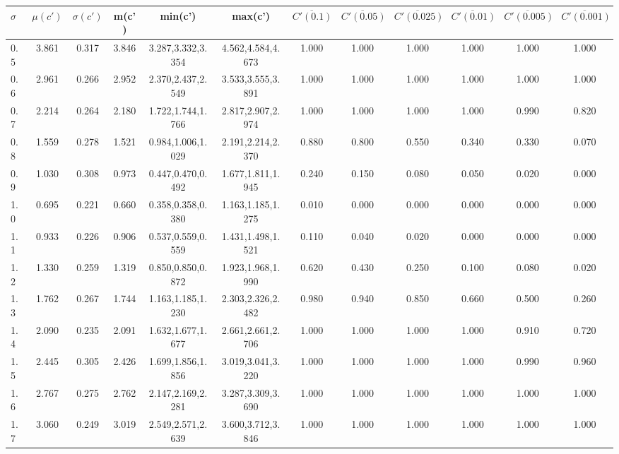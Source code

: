 \begin{table*}[h!]
\begin{center}
\begin{tabular}{| l | c | c | c | c | c | c | c | c | c | c | c |}\hline
$\sigma$ & $\mu(c')$ & $\sigma(c')$ & m(c') & min(c') & max(c') & $\overline{C'(0.1)}$ & $\overline{C'(0.05)}$ & $\overline{C'(0.025)}$ & $\overline{C'(0.01)}$ & $\overline{C'(0.005)}$ & $\overline{C'(0.001)}$ \\\hline
0.5 & 3.861 & 0.317 & 3.846 & 3.287,3.332,3.354 & 4.562,4.584,4.673  & 1.000  & 1.000  & 1.000  & 1.000  & 1.000  & 1.000 \\\hline
0.6 & 2.961 & 0.266 & 2.952 & 2.370,2.437,2.549 & 3.533,3.555,3.891  & 1.000  & 1.000  & 1.000  & 1.000  & 1.000  & 1.000 \\\hline
0.7 & 2.214 & 0.264 & 2.180 & 1.722,1.744,1.766 & 2.817,2.907,2.974  & 1.000  & 1.000  & 1.000  & 1.000  & 0.990  & 0.820 \\\hline
0.8 & 1.559 & 0.278 & 1.521 & 0.984,1.006,1.029 & 2.191,2.214,2.370  & 0.880  & 0.800  & 0.550  & 0.340  & 0.330  & 0.070 \\\hline
0.9 & 1.030 & 0.308 & 0.973 & 0.447,0.470,0.492 & 1.677,1.811,1.945  & 0.240  & 0.150  & 0.080  & 0.050  & 0.020  & 0.000 \\\hline
1.0 & 0.695 & 0.221 & 0.660 & 0.358,0.358,0.380 & 1.163,1.185,1.275  & 0.010  & 0.000  & 0.000  & 0.000  & 0.000  & 0.000 \\\hline
1.1 & 0.933 & 0.226 & 0.906 & 0.537,0.559,0.559 & 1.431,1.498,1.521  & 0.110  & 0.040  & 0.020  & 0.000  & 0.000  & 0.000 \\\hline
1.2 & 1.330 & 0.259 & 1.319 & 0.850,0.850,0.872 & 1.923,1.968,1.990  & 0.620  & 0.430  & 0.250  & 0.100  & 0.080  & 0.020 \\\hline
1.3 & 1.762 & 0.267 & 1.744 & 1.163,1.185,1.230 & 2.303,2.326,2.482  & 0.980  & 0.940  & 0.850  & 0.660  & 0.500  & 0.260 \\\hline
1.4 & 2.090 & 0.235 & 2.091 & 1.632,1.677,1.677 & 2.661,2.661,2.706  & 1.000  & 1.000  & 1.000  & 1.000  & 0.910  & 0.720 \\\hline
1.5 & 2.445 & 0.305 & 2.426 & 1.699,1.856,1.856 & 3.019,3.041,3.220  & 1.000  & 1.000  & 1.000  & 1.000  & 0.990  & 0.960 \\\hline
1.6 & 2.767 & 0.275 & 2.762 & 2.147,2.169,2.281 & 3.287,3.309,3.690  & 1.000  & 1.000  & 1.000  & 1.000  & 1.000  & 1.000 \\\hline
1.7 & 3.060 & 0.249 & 3.019 & 2.549,2.571,2.639 & 3.600,3.712,3.846  & 1.000  & 1.000  & 1.000  & 1.000  & 1.000  & 1.000 \\\hline

\end{tabular}
\end{center}
\end{table*}

